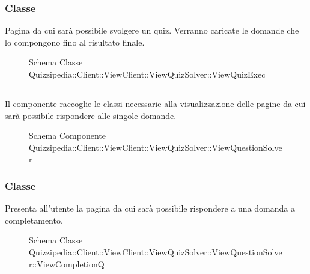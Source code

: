 \subsubsection{Classe }
Pagina da cui sarà possibile svolgere un quiz. Verranno caricate le domande che lo compongono fino al risultato finale.
\begin{figure}[H]
\centering
\noindent{}
\caption[Schema Classe ViewQuizExec]{Schema Classe Quizzipedia::Client::ViewClient::ViewQuizSolver::ViewQuizExec}
\end{figure}
\subsection{}
Il componente raccoglie le classi necessarie alla visualizzazione delle pagine da cui sarà possibile rispondere alle singole domande.
\begin{figure}[H]
\centering
\noindent{}
\caption[Schema Componente Quizzipedia::Client::ViewClient::ViewQuizSolver::ViewQuestionSolver]{Schema Componente Quizzipedia::Client::ViewClient::ViewQuizSolver::ViewQuestionSolver}
\end{figure}
\subsubsection{Classe }
Presenta all'utente la pagina da cui sarà possibile rispondere a una domanda a completamento.
\begin{figure}[H]
\centering
\noindent{}
\caption[Schema Classe ViewCompletionQ]{Schema Classe Quizzipedia::Client::ViewClient::ViewQuizSolver::ViewQuestionSolver::ViewCompletionQ}
\end{figure}
